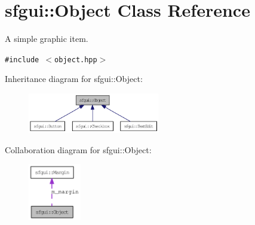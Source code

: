 \hypertarget{classsfgui_1_1Object}{
\section{sfgui::Object Class Reference}
\label{classsfgui_1_1Object}
}
A simple graphic item.  


{\tt \#include $<$object.hpp$>$}

Inheritance diagram for sfgui::Object:\nopagebreak
\begin{figure}[H]
\begin{center}
\leavevmode
\includegraphics[width=163pt]{classsfgui_1_1Object__inherit__graph}
\end{center}
\end{figure}
Collaboration diagram for sfgui::Object:\nopagebreak
\begin{figure}[H]
\begin{center}
\leavevmode
\includegraphics[width=65pt]{classsfgui_1_1Object__coll__graph}
\end{center}
\end{figure}
